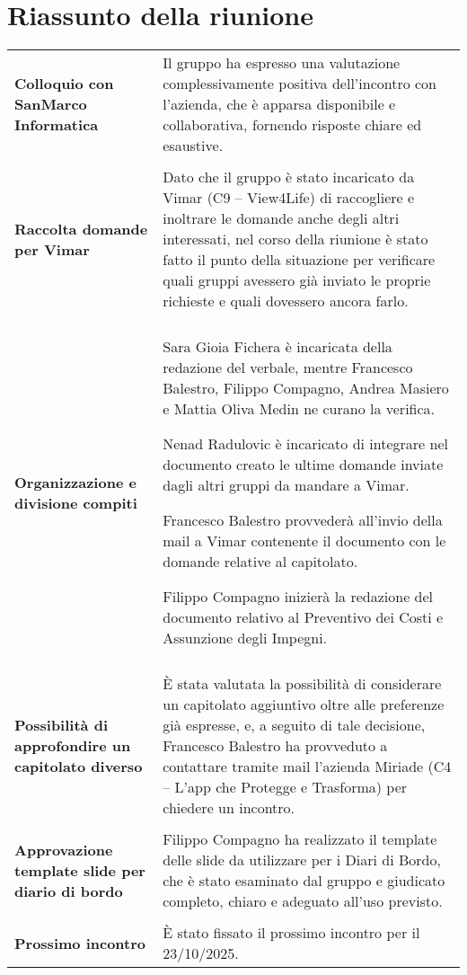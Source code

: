 \documentclass[a4paper,12pt]{article}
\begin{document}
\section{Riassunto della riunione}
\begin{longtable}{P{4cm}|P{9cm}}
\textbf{Colloquio con SanMarco Informatica} & Il gruppo ha espresso una valutazione complessivamente positiva dell’incontro con l’azienda, che è apparsa disponibile e collaborativa, fornendo risposte chiare ed esaustive. \\
\\

\textbf{Raccolta domande per Vimar} & Dato che il gruppo è stato incaricato da Vimar (C9 – View4Life) di raccogliere e inoltrare le domande anche degli altri interessati, nel corso della riunione è stato fatto il punto della situazione per verificare quali gruppi avessero già inviato le proprie richieste e quali dovessero ancora farlo. \\
\\
\textbf{Organizzazione e divisione compiti} & Sara Gioia Fichera è incaricata della redazione del verbale, mentre Francesco Balestro, Filippo Compagno, Andrea Masiero e Mattia Oliva Medin ne curano la verifica.

Nenad Radulovic è incaricato di integrare nel documento creato le ultime domande inviate dagli altri gruppi da mandare a Vimar.

Francesco Balestro provvederà all’invio della mail a Vimar contenente il documento con le domande relative al capitolato.

Filippo Compagno inizierà la redazione del documento relativo al Preventivo dei Costi e Assunzione degli Impegni.
\\
\\

\textbf{Possibilità di approfondire un capitolato diverso} & È stata valutata la possibilità di considerare un capitolato aggiuntivo oltre alle preferenze già espresse, e, a seguito di tale decisione, Francesco Balestro ha provveduto a contattare tramite mail l’azienda Miriade (C4 – L’app che Protegge e Trasforma) per chiedere un incontro.\\
\\

\textbf{Approvazione template slide per diario di bordo} & Filippo Compagno ha realizzato il template delle slide da utilizzare per i Diari di Bordo, che è stato esaminato dal gruppo e giudicato completo, chiaro e adeguato all’uso previsto.\\
\\

\textbf{Prossimo incontro} & È stato fissato il prossimo incontro per il 23/10/2025.  \\
\end{longtable}
\end{document}
